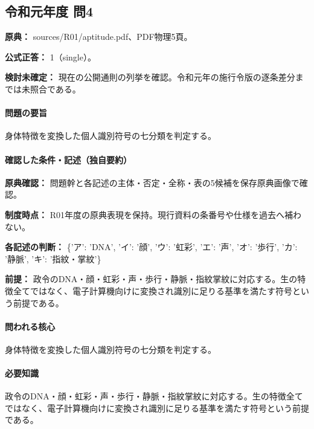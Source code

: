 \subsection{令和元年度 問4}
\label{q:r01-reg-apt-04}

\noindent\textbf{原典：} sources/R01/aptitude.pdf、PDF物理5頁。

\textbf{公式正答：} 1（single）。

\par\textbf{検討未確定：} 現在の公開通則の列挙を確認。令和元年の施行令版の逐条差分までは未照合である。

\paragraph{問題の要旨} 身体特徴を変換した個人識別符号の七分類を判定する。

\paragraph{確認した条件・記述（独自要約）}\mbox{}\par

\noindent\textbf{原典確認：} 問題幹と各記述の主体・否定・全称・表の5候補を保存原典画像で確認。\par

\noindent\textbf{制度時点：} R01年度の原典表現を保持。現行資料の条番号や仕様を過去へ補わない。\par

\noindent\textbf{各記述の判断：} \{'ア': 'DNA', 'イ': '顔', 'ウ': '虹彩', 'エ': '声', 'オ': '歩行', 'カ': '静脈', 'キ': '指紋・掌紋'\}\par

\noindent\textbf{前提：} 政令のDNA・顔・虹彩・声・歩行・静脈・指紋掌紋に対応する。生の特徴全てではなく、電子計算機向けに変換され識別に足りる基準を満たす符号という前提である。\par

\paragraph{問われる核心} 身体特徴を変換した個人識別符号の七分類を判定する。

\paragraph{必要知識} 政令のDNA・顔・虹彩・声・歩行・静脈・指紋掌紋に対応する。生の特徴全てではなく、電子計算機向けに変換され識別に足りる基準を満たす符号という前提である。

